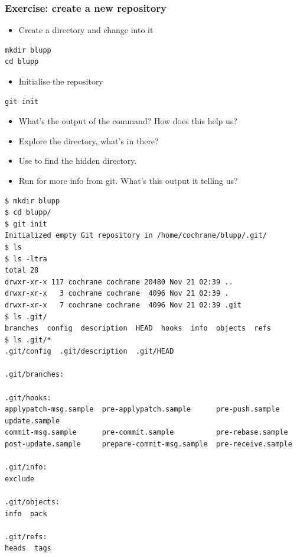 \documentclass{git_course}
\begin{document}
\begin{frame}[fragile]
\frametitle{Exercise: create a new repository}
\begin{itemize}
    \item Create a directory and change into it
\end{itemize}
\begin{lstlisting}
mkdir blupp
cd blupp
\end{lstlisting}
\begin{itemize}
    \item Initialise the repository
\end{itemize}
\begin{lstlisting}
git init
\end{lstlisting}
\begin{itemize}
    \item What's the output of the  command?  How does this
        help us?
    \item Explore the directory, what's in there?
    \item Use  to find the hidden directory.
    \item Run  for more info from git.  What's this
        output it telling us?
\end{itemize}
\end{frame}


\begin{frame}[fragile]
\begin{lstlisting}[basicstyle=\tiny\ttfamily]
$ mkdir blupp
$ cd blupp/
$ git init
Initialized empty Git repository in /home/cochrane/blupp/.git/
$ ls
$ ls -ltra
total 28
drwxr-xr-x 117 cochrane cochrane 20480 Nov 21 02:39 ..
drwxr-xr-x   3 cochrane cochrane  4096 Nov 21 02:39 .
drwxr-xr-x   7 cochrane cochrane  4096 Nov 21 02:39 .git
$ ls .git/
branches  config  description  HEAD  hooks  info  objects  refs
$ ls .git/*
.git/config  .git/description  .git/HEAD

.git/branches:

.git/hooks:
applypatch-msg.sample  pre-applypatch.sample      pre-push.sample     update.sample
commit-msg.sample      pre-commit.sample          pre-rebase.sample
post-update.sample     prepare-commit-msg.sample  pre-receive.sample

.git/info:
exclude

.git/objects:
info  pack

.git/refs:
heads  tags
\end{lstlisting}
\end{frame}
\end{document}
